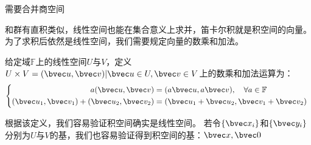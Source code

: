 

\begin{issues}
\issueDraft 
需要合并商空间
\end{issues}
和群有直积类似，线性空间也能在集合意义上求并，笛卡尔积就是积空间的向量。为了求积后依然是线性空间，我们需要规定向量的数乘和加法。

\begin{definition}{}
给定域$\mathbb F $上的线性空间$U$与$V$，定义$U\times V={(\bvec u,\bvec v)|\bvec u\in U,\bvec v\in V}$上的数乘和加法运算为：
\begin{equation}
\left\{\begin{aligned}
a(\bvec u,\bvec v)&=(a\bvec u,a\bvec v),\quad \forall a\in \mathbb F\\
(\bvec u_1,\bvec v_1)+(\bvec u_2,\bvec v_2)&=(\bvec u_1+\bvec u_2,\bvec v_1+\bvec v_2)
\end{aligned}\right.~
\end{equation}
\end{definition}
根据该定义，我们容易验证积空间确实是线性空间。
若令$\{\bvec x_i\}$和$\{\bvec y_i\}$分别为$U$与$V$的基，我们也容易验证得到积空间的基：${\bvec x,\bvec 0}$